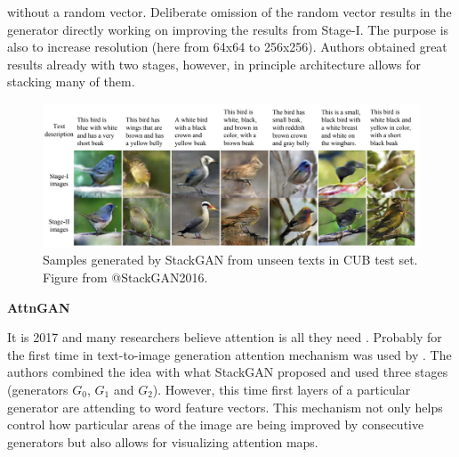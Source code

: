 \documentclass[
]{krantz}
\begin{document}
without a random vector. Deliberate omission of the random vector results in the generator directly working on improving the results from Stage-I. The purpose is also to increase resolution (here from 64x64 to 256x256). Authors obtained great results already with two stages, however, in principle architecture allows for stacking many of them.

\begin{figure}

{\centering \includegraphics[width=1\linewidth]{figures/02-02-text-2-img/stackgan} 

}

\caption{Samples generated by StackGAN from unseen texts in CUB test set. Figure from @StackGAN2016.}\label{fig:stackgan}
\end{figure}

\textbf{AttnGAN}

It is 2017 and many researchers believe attention is all they need \citep{AttentionIsAllYouNeed2017}. Probably for the first time in text-to-image generation attention mechanism was used by \citet{AttnGAN2017}. The authors combined the idea with what StackGAN proposed and used three stages (generators \(G_{0}\), \(G_{1}\) and \(G_{2}\)). However, this time first layers of a particular generator are attending to word feature vectors. This mechanism not only helps control how particular areas of the image are being improved by consecutive generators but also allows for visualizing attention maps.
\end{document}
